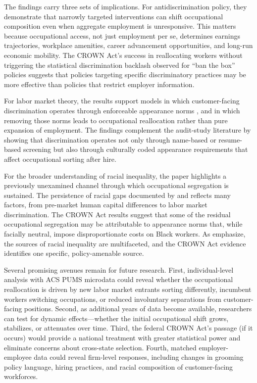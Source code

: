 \documentclass[12pt]{article}
\begin{document}
The findings carry three sets of implications. For antidiscrimination policy, they demonstrate that narrowly targeted interventions can shift occupational composition even when aggregate employment is unresponsive. This matters because occupational access, not just employment per se, determines earnings trajectories, workplace amenities, career advancement opportunities, and long-run economic mobility. The CROWN Act's success in reallocating workers without triggering the statistical discrimination backlash observed for ``ban the box'' policies \citep{agan2018, doleac2020} suggests that policies targeting specific discriminatory practices may be more effective than policies that restrict employer information.

For labor market theory, the results support models in which customer-facing discrimination operates through enforceable appearance norms \citep{becker1957}, and in which removing those norms leads to occupational reallocation rather than pure expansion of employment. The findings complement the audit-study literature \citep{bertrand2004discrimination, kline2022} by showing that discrimination operates not only through name-based or resume-based screening but also through culturally coded appearance requirements that affect occupational sorting after hire.

For the broader understanding of racial inequality, the paper highlights a previously unexamined channel through which occupational segregation is sustained. The persistence of racial gaps documented by \citet{chetty2020} and \citet{neal1996} reflects many factors, from pre-market human capital differences to labor market discrimination. The CROWN Act results suggest that some of the residual occupational segregation may be attributable to appearance norms that, while facially neutral, impose disproportionate costs on Black workers. As \citet{lang2020} emphasize, the sources of racial inequality are multifaceted, and the CROWN Act evidence identifies one specific, policy-amenable source.

Several promising avenues remain for future research. First, individual-level analysis with ACS PUMS microdata could reveal whether the occupational reallocation is driven by new labor market entrants sorting differently, incumbent workers switching occupations, or reduced involuntary separations from customer-facing positions. Second, as additional years of data become available, researchers can test for dynamic effects---whether the initial occupational shift grows, stabilizes, or attenuates over time. Third, the federal CROWN Act's passage (if it occurs) would provide a national treatment with greater statistical power and eliminate concerns about cross-state selection. Fourth, matched employer-employee data could reveal firm-level responses, including changes in grooming policy language, hiring practices, and racial composition of customer-facing workforces.
\end{document}
